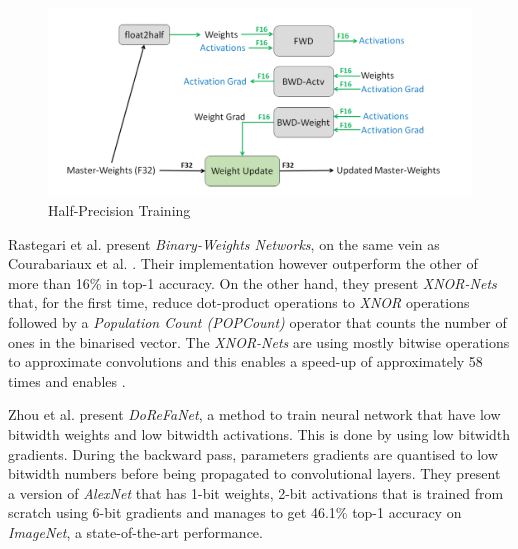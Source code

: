 \begin{figure}[htbp]
	\centering
		\includegraphics[width=\textwidth]{Figures/HPTraining.png}
	\caption[HPTraining]{Half-Precision Training  \cite{Micikevicius2017}}
	\label{fig:HPTraining}
\end{figure}

Rastegari et al. \cite{Rastegari2016} present \emph{Binary-Weights Networks}, on the same vein as Courabariaux et al. \cite{Courbariaux2016}. Their implementation however outperform the other of more than 16\% in top-1 accuracy. On the other hand, they present \emph{XNOR-Nets} that, for the first time, reduce dot-product operations to \emph{XNOR} operations followed by a \emph{Population Count (POPCount)} operator that counts the number of ones in the binarised vector. The \emph{XNOR-Nets} are using mostly bitwise operations to approximate convolutions and this enables a speed-up of approximately 58 times and enables .

Zhou et al. \cite{Zhou2016} present \emph{DoReFaNet}, a method to train neural network that have low bitwidth weights and low bitwidth activations. This is done by using low bitwidth gradients. During the backward pass, parameters gradients are quantised to low bitwidth numbers before being propagated to convolutional layers. They present a version of \emph{AlexNet} that has 1-bit weights, 2-bit activations that is trained from scratch using 6-bit gradients and manages to get 46.1\% top-1 accuracy on \emph{ImageNet}, a state-of-the-art performance.

